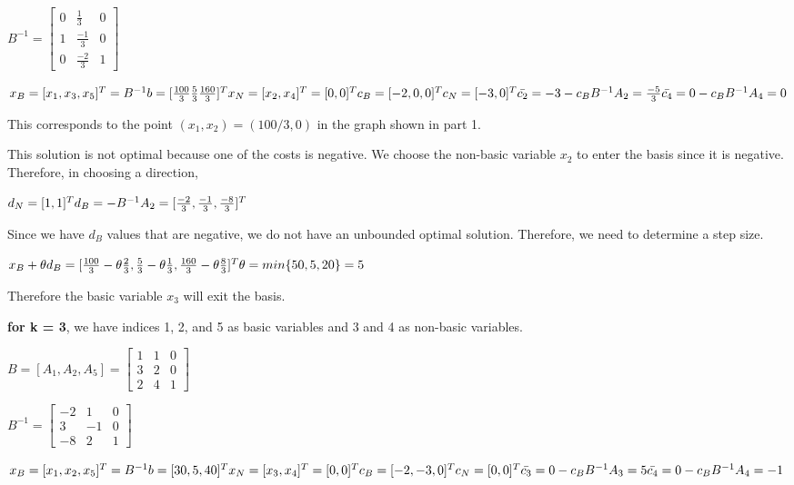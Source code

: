 \documentclass[11pt]{article}
\begin{document}
\(B^{-1} = \begin{bmatrix} 0 & \frac{1}{3} & 0 \\ 1 & \frac{-1}{3} & 0 \\ 0 & \frac{-2}{3} & 1 \end{bmatrix}\)

\(x_B = [x_1, x_3, x_5]^T = B^{-1}b = [\frac{100}{3} \frac{5}{3} \frac{160}{3}]^ T \\ x_N = [x_2, x_4]^T = [0, 0]^T \\ c_B = [-2, 0, 0]^T \\ c_N = [-3, 0]^T \\ \bar{c_2} = -3 - c_B B^{-1} A_2 = \frac{-5}{3} \\ \bar{c_4} = 0 - c_B B^{-1} A_4 = 0\)

This corresponds to the point \((x_1, x_2) = (100/3, 0)\) in the graph
shown in part 1.

This solution is not optimal because one of the costs is negative. We
choose the non-basic variable \(x_2\) to enter the basis since it is
negative. Therefore, in choosing a direction,

\(d_N = [1, 1]^T \\ d_B = -B^{-1} A_2 = [\frac{-2}{3}, \frac{-1}{3}, \frac{-8}{3}]^T\)

Since we have \(d_B\) values that are negative, we do not have an
unbounded optimal solution. Therefore, we need to determine a step size.

\(x_B + \theta d_B = [\frac{100}{3} - \theta\frac{2}{3}, \frac{5}{3} - \theta\frac{1}{3}, \frac{160}{3} - \theta\frac{8}{3}]^T \\ \theta = min \{50, 5, 20 \} = 5\)

Therefore the basic variable \(x_3\) will exit the basis.

    \textbf{for k = 3}, we have indices 1, 2, and 5 as basic variables and 3
and 4 as non-basic variables.

\(B = [A_1, A_2, A_5] = \begin{bmatrix} 1 & 1 & 0 \\ 3 & 2 & 0 \\ 2 & 4 & 1 \end{bmatrix}\)

\(B^{-1} = \begin{bmatrix} -2 & 1 & 0 \\ 3 & -1 & 0 \\ -8 & 2 & 1 \end{bmatrix}\)

\(x_B = [x_1, x_2, x_5]^T = B^{-1}b = [30, 5, 40]^ T \\ x_N = [x_3, x_4]^T = [0, 0]^T \\ c_B = [-2, -3, 0]^T \\ c_N = [0, 0]^T \\ \bar{c_3} = 0 - c_B B^{-1} A_3 = 5 \\ \bar{c_4} = 0 - c_B B^{-1} A_4 = -1\)
\end{document}
